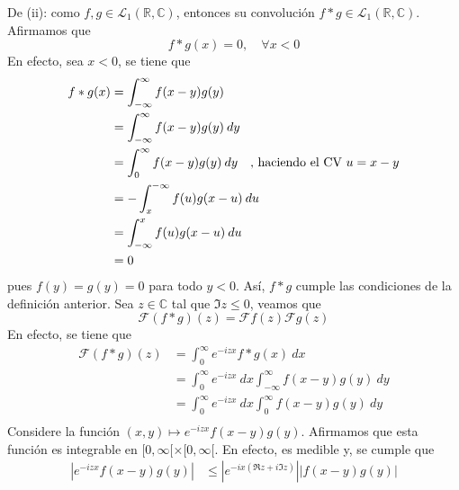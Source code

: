 \documentclass[12pt]{report}
\newcounter{it}
\theoremstyle{largebreak}
\renewcommand{\leq}{\ensuremath{\leqslant}}
\newcommand\abs[1]{\ensuremath{\left|#1\right|}}
\newcommand{\fou}[1]{\ensuremath{\mathcal{F}#1}}
\begin{document}
\begin{sol}
        De (ii): como $f,g\in\mathcal{L}_1(\mathbb{R},\mathbb{C})$, entonces su convolución $f*g\in\mathcal{L}_1(\mathbb{R},\mathbb{C})$. Afirmamos que
        \begin{equation*}
            f*g(x)=0,\quad\forall x<0
        \end{equation*}
        En efecto, sea $x<0$, se tiene que
        \begin{equation*}
            \begin{split}
                f*g(x)&=\int_{-\infty}^{\infty}f(x-y)g(y)\\
                &=\int_{-\infty}^{\infty}f(x-y)g(y)\:dy\\
                &=\int_{0}^{\infty}f(x-y)g(y)\:dy\quad\textup{, haciendo el CV }u=x-y\\
                &=-\int_{x}^{-\infty}f(u)g(x-u)\:du\\
                &=\int_{-\infty}^{x}f(u)g(x-u)\:du\\
                &=0\\
            \end{split}
        \end{equation*}
        pues $f(y)=g(y)=0$ para todo $y<0$. Así, $f*g$ cumple las condiciones de la definición anterior. Sea $z\in\mathbb{C}$ tal que $\Im z\leq0$, veamos que
        \begin{equation*}
            \fou{(f*g)}(z)=\fou{f}(z)\fou{g}(z)
        \end{equation*}
        En efecto, se tiene que
        \begin{equation*}
            \begin{split}
                \fou{(f*g)}(z)&=\int_0^{\infty}e^{ -izx}f*g(x)\:dx\\
                &=\int_0^{\infty}e^{ -izx}\:dx\int_{-\infty}^{\infty}f(x-y)g(y)\:dy\\
                &=\int_0^{\infty}e^{ -izx}\:dx\int_{0}^{\infty}f(x-y)g(y)\:dy\\
            \end{split}
        \end{equation*}
        Considere la función $(x,y)\mapsto e^{ -izx}f(x-y)g(y)$. Afirmamos que esta función es integrable en $[0,\infty[\times[0,\infty[$. En efecto, es medible y, se cumple que
        \begin{equation*}
            \begin{split}
                \abs{e^{ -izx}f(x-y)g(y)}&\leq\abs{e^{ -ix(\Re z+i\Im z)}}\abs{f(x-y)g(y)}\\

\end{split}
\end{equation*}
\end{sol}
\end{document}
